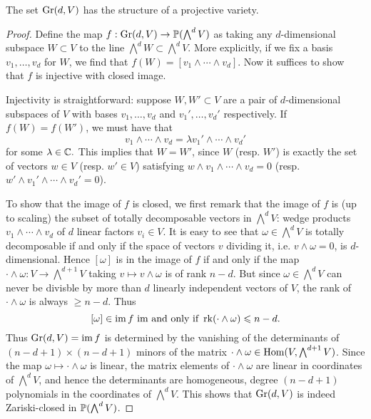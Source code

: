 \begin{proposition}
    The set $\operatorname{Gr}(d,V)$ has the structure of a projective variety.
\end{proposition}
\begin{proof}
    Define the map $f:\operatorname{Gr}(d,V)\to\operatorname{\mathbb{P}}(\bigwedge^dV)$ as taking any $d$-dimensional subspace $W\subset V$ to the
    line $\bigwedge^d W\subset \bigwedge^dV$. More explicitly, if we fix a basis $v_1,\ldots, v_d$ for $W$,
    we find that $f(W)=[v_1\wedge\cdots\wedge v_d]$. Now it suffices to show that $f$ is injective with closed image.

    Injectivity is straightforward: suppose $W,W'\subset V$ are a pair of $d$-dimensional subspaces of $V$
    with bases $v_1,\ldots,v_d$ and $v_1',\ldots,v_d'$ respectively. If $f(W)=f(W')$, we must have that
    \[v_1\wedge\cdots\wedge v_d=\lambda v_1'\wedge\cdots\wedge v_d'\]
    for some $\lambda\in\mathbb{C}.$ This implies
    that $W=W'$, since $W$ (resp. $W'$) is exactly the set of vectors $w\in V$ (resp. $w'\in V$) satisfying
    $w\wedge v_1\wedge\cdots\wedge v_d=0$ (resp. $w'\wedge v_1'\wedge\cdots\wedge v_d'=0$).

    To show that the image of $f$ is closed, we first remark that the image of $f$ is (up to scaling) the subset
    of totally decomposable vectors in $\bigwedge^dV$: wedge products $v_1\wedge\cdots\wedge v_d$
    of $d$ linear factors $v_i\in V$. It is easy to see that $\omega\in\bigwedge^dV$ is totally decomposable if
    and only if the space of vectors $v$ dividing it, i.e. $v\wedge\omega=0$, is $d$-dimensional.
    Hence $[\omega]$ is in the image of $f$ if and only if the map $\cdot\wedge\omega:V\to \bigwedge^{d+1}V$
    taking $v\mapsto v\wedge \omega$ is of rank $n-d$. But since $\omega\in\bigwedge^dV$ can never
    be divisble by more than $d$ linearly independent vectors of $V$, the rank of $\cdot\wedge\omega$
    is always $\geqslant n-d$. Thus
    \[ [\omega]\in\operatorname{im} f\text{ im and only if }\operatorname{rk}(\cdot\wedge\omega)\leqslant n-d.\]
    Thus $\operatorname{Gr}(d,V)=\operatorname{im} f$ is determined by the vanishing of the determinants of $(n-d+1)\times(n-d+1)$ minors
    of the matrix $\cdot\wedge\omega\in\operatorname{Hom}(V,\bigwedge^{d+1}V)$.
    Since the map $\omega\mapsto \cdot\wedge\omega$ is linear, the matrix elements of $\cdot\wedge\omega$
    are linear in coordinates of $\bigwedge^dV$, and hence the determinants are homogeneous, degree $(n-d+1)$
    polynomials in the coordinates of $\bigwedge^dV$. This shows that $\operatorname{Gr}(d,V)$ is indeed
    Zariski-closed in $\operatorname{\mathbb{P}}(\bigwedge^dV)$.
\end{proof}

